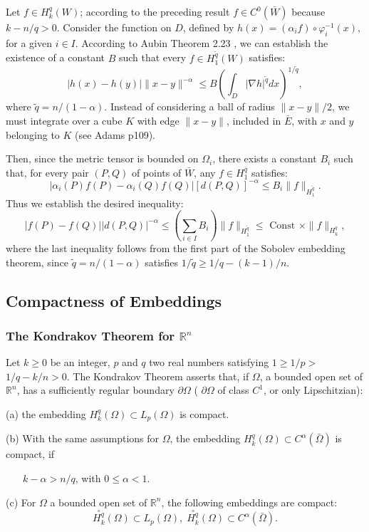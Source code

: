 \documentclass[12pt,hyperref,a4paper,UTF8]{ctexart}
\begin{document}
\vskip 10pt
\begin{Proofc}
    Let $f \in H_k^q(W)$; according to the preceding result $f \in C^0(\bar{W})$ because $k-n / q>0$. Consider the function on $D$, defined by $h(x)=\left(\alpha_i f\right) \circ \varphi_i^{-1}(x)$, for a given $i \in I$. According to Aubin \cite{Aubin} Theorem 2.23 , we can establish the existence of a constant $B$ such that every $f \in H_1^{\tilde{q}}(W)$ satisfies:
    $$
    |h(x)-h(y)|\|x-y\|^{-\alpha} \leq B\left(\int_D|\nabla h|^{\tilde{q}} d x\right)^{1 / \tilde{q}},
    $$
    where $\tilde{q}=n /(1-\alpha)$. Instead of considering a ball of radius $\|x-y\| / 2$, we must integrate over a cube $K$ with edge $\|x-y\|$, included in $\bar{E}$, with $x$ and $y$ belonging to $K$ (see Adams \cite{A} p109).
    
    \vskip 3pt
    \noindent
    Then, since the metric tensor is bounded on $\Omega_i$, there exists a constant $B_i$ such that, for every pair $(P, Q)$ of points of $\bar{W}$, any $f \in H_1^{\bar{q}}$ satisfies:
    $$
    \left|\alpha_i(P) f(P)-\alpha_i(Q) f(Q)\right|[d(P, Q)]^{-\alpha} \leq B_i\|f\|_{H_1^{\tilde{q}}} .
    $$
    Thus we establish the desired inequality:
    $$
    |f(P)-f(Q)||d(P, Q)|^{-\alpha} \leq\left(\sum_{i \in I} B_i\right)\|f\|_{H_1^{\tilde{q}}} \leq \text { Const } \times\|f\|_{H_k^{q}},
    $$
    where the last inequality follows from the first part of the Sobolev embedding theorem, since $\tilde{q}=n /(1-\alpha)$ satisfies $1 / \tilde{q} \geq 1 / q-(k-1) / n$.
\end{Proofc}


\subsection{Compactness of Embeddings}

\subsubsection{The Kondrakov Theorem for $\mathbb{R}^n$}

\begin{Theorem}
Let $k \geq 0$ be an integer, $p$ and $q$ two real numbers satisfying $1 \geq 1 / p>$ $1 / q-k / n>0$. The Kondrakov Theorem asserts that, if $\Omega$, a bounded open set of $\mathbb{R}^n$, has a sufficiently regular boundary $\partial \Omega$ ( $\partial \Omega$ of class $C^1$, or only Lipschitzian):

(a) the embedding $H_k^q(\Omega) \subset L_p(\Omega)$ is compact.

(b) With the same assumptions for $\Omega$, the embedding $H_k^q(\Omega) \subset C^\alpha(\bar{\Omega})$ is compact, if 

$\quad\;\;\,$$k-\alpha>n / q$, with $0 \leq \alpha<1$.

(c) For $\Omega$ a bounded open set of $\mathbb{R}^n$, the following embeddings are compact:
$$
\stackrel{\circ}{H_k^q}(\Omega) \subset L_p(\Omega),\; \stackrel{\circ}{H^q_k}(\Omega) \subset C^\alpha(\bar{\Omega}) .
$$
\label{thm55}
\end{Theorem}
\end{document}
